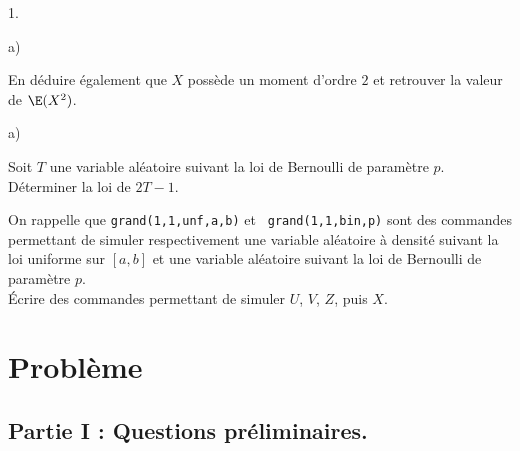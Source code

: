 \documentclass[11pt]{article}%
\begin{document}
\begin{noliste}{1.}
\begin{noliste}{a)}
  \item En déduire également que $X$ possède un moment d'ordre $2$ et
    retrouver la valeur de $\E(X^{2})$.

    

\end{noliste}

\item
  \begin{noliste}{a)}
    \setlength{\itemsep}{2mm}
  \item Soit $T$ une variable aléatoire suivant la loi de Bernoulli de
    paramètre $p$.\\
    Déterminer la loi de $2T-1$.

    

  \item On rappelle que {\tt grand(1,1,\ttq{}unf\ttq{},a,b)} et {\tt
      grand(1,1,\ttq{}bin\ttq{},p)} sont des commandes \Scilab{}
    permettant de simuler respectivement une variable aléatoire à
    densité suivant la loi uniforme sur $[a,b]$ et une variable
    aléatoire suivant la loi de Bernoulli de paramètre $p$.\\
    Écrire des commandes \Scilab{} permettant de simuler $U$, $V$,
    $Z$, puis $X$.

    
  \end{noliste}
\end{noliste}

\section*{Problème}

\subsection*{Partie I : Questions préliminaires.}
\end{document}
